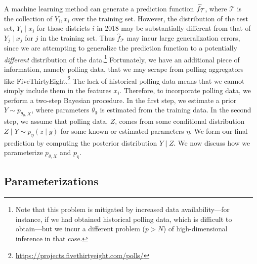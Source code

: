 \documentclass[11pt]{article}
\begin{document}
A machine learning method can generate a prediction function $\hat f_{\cal T}$,
where $\mathcal T$ is the collection of $Y_i, x_i$ over the training set.
However, the
distribution of the test set, $Y_i \mid x_i$ for those districts $i$ in 2018 may
be
substantially different from that of $Y_j \mid x_j$ for $j$ in the training
set. Thus $\hat f_{\mathcal T}$ may incur large generalization errors, since we
are attempting to generalize the prediction function to a potentially 
\emph{different}
distribution
of the data.\footnote{Note that this problem is mitigated by increased data
availability---for instance, if we had obtained historical polling data,
which is difficult to obtain---but we incur a different problem ($p > N$) of
high-dimensional
inference in that case.} Fortunately, we have an additional piece of
information, namely polling data, that we may scrape from polling aggregators
like
FiveThirtyEight.\footnote{\url{https://projects.fivethirtyeight.com/polls/}} The
lack of historical polling data means that we cannot simply include them in the
features $x_i$. Therefore, to incorporate polling data, we perform a two-step
Bayesian procedure. In the first step, we estimate a prior $Y \sim p_{\theta_0,
X}$, where parameters $\theta_0$ is estimated from the training data. In the
second step, we assume that polling data, $Z$, comes from some conditional
distribution $Z \mid Y \sim p_{\eta}(z\mid y)$ for some known or
estimated parameters
$\eta$. We form our final prediction by computing the posterior distribution $Y
\mid Z$. We now discuss how we parameterize $p_{\theta, X}$ and $p_\eta$.

\subsection{Parameterizations}
\end{document}
